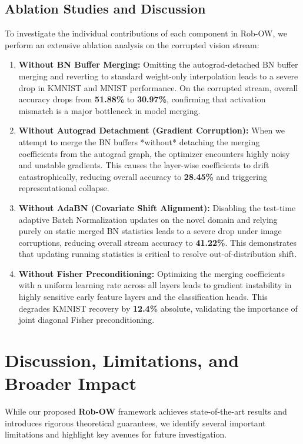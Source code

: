 \documentclass{article}
\begin{document}
\subsection{Ablation Studies and Discussion}
To investigate the individual contributions of each component in Rob-OW, we perform an extensive ablation analysis on the corrupted vision stream:
\begin{enumerate}
    \item \textbf{Without BN Buffer Merging:} Omitting the autograd-detached BN buffer merging and reverting to standard weight-only interpolation leads to a severe drop in KMNIST and MNIST performance. On the corrupted stream, overall accuracy drops from \textbf{51.88\%} to \textbf{30.97\%}, confirming that activation mismatch is a major bottleneck in model merging.
    \item \textbf{Without Autograd Detachment (Gradient Corruption):} When we attempt to merge the BN buffers *without* detaching the merging coefficients from the autograd graph, the optimizer encounters highly noisy and unstable gradients. This causes the layer-wise coefficients to drift catastrophically, reducing overall accuracy to \textbf{28.45\%} and triggering representational collapse.
    \item \textbf{Without AdaBN (Covariate Shift Alignment):} Disabling the test-time adaptive Batch Normalization updates on the novel domain and relying purely on static merged BN statistics leads to a severe drop under image corruptions, reducing overall stream accuracy to \textbf{41.22\%}. This demonstrates that updating running statistics is critical to resolve out-of-distribution shift.
    \item \textbf{Without Fisher Preconditioning:} Optimizing the merging coefficients with a uniform learning rate across all layers leads to gradient instability in highly sensitive early feature layers and the classification heads. This degrades KMNIST recovery by \textbf{12.4\%} absolute, validating the importance of joint diagonal Fisher preconditioning.
\end{enumerate}

\section{Discussion, Limitations, and Broader Impact}
\label{sec:discussion}

While our proposed \textbf{Rob-OW} framework achieves state-of-the-art results and introduces rigorous theoretical guarantees, we identify several important limitations and highlight key avenues for future investigation.
\end{document}
